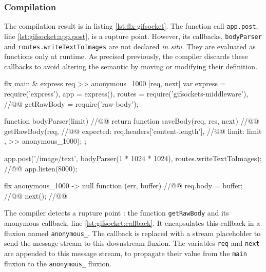 \subsubsection{Compilation}

The compilation result is in listing \ref{lst:flx-gifsocket}.
The function call \texttt{app.post}, line \ref{lst:gifsocket:app.post}, is a rupture point.
However, its callbacks, \texttt{bodyParser} and \texttt{routes.write\-Text\-To\-Images} are not declared \textit{in situ}.
They are evaluated as functions only at runtime.
As precised previously, the compiler discards these callbacks to avoid altering the semantic by moving or modifying their definition.

\begin{code}[flx, caption={Compilation result of gifsockets-server},label={lst:flx-gifsocket}]
flx main & express {req}
>> anonymous_1000 [req, next]
  var express = require('express'),
      app = express(),
      routes = require('gifsockets-middleware'), //@\label{lst:flx-gifsocket:gif-mw}@
      getRawBody = require('raw-body');

  function bodyParser(limit) { //@\label{lst:flx-gifsocket:bodyParser}@
    return function saveBody(req, res, next) { //@\label{lst:flx-gifsocket:saveBody}@
      getRawBody(req, { //@\label{lst:flx-gifsocket:getRawBody}@
        expected: req.headers['content-length'], //@\label{lst:flx-gifsocket:req.headers}@
        limit: limit
      }, >> anonymous_1000);
    };
  }

  app.post('/image/text', bodyParser(1 * 1024 * 1024), routes.writeTextToImages); //@\label{lst:flx-gifsocket:app.post}@
  app.listen(8000);

flx anonymous_1000
-> null
  function (err, buffer) { //@\label{lst:flx-gifsocket:callback}@
    req.body = buffer; //@\label{lst:flx-gifsocket:buffer}@
    next(); //@\label{lst:flx-gifsocket:next}@
  }
\end{code}

The compiler detects a rupture point : the function \texttt{get\-Raw\-Body} and its anonymous callback, line \ref{lst:gifsocket:callback}.
It encapsulates this callback in a fluxion named \texttt{anonymous\_}.
The callback is replaced with a stream placeholder to send the message stream to this downstream fluxion.
The variables \texttt{req} and \texttt{next} are appended to this message stream, to propagate their value from the \texttt{main} fluxion to the \texttt{anonymous\_} fluxion.

